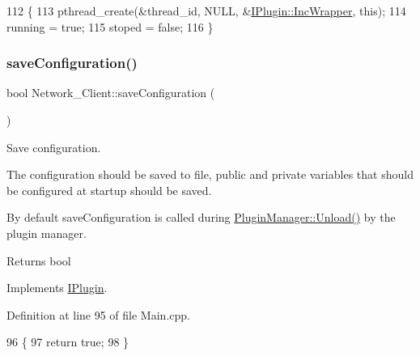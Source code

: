 \begin{DoxyCode}
112 \{
113     pthread\_create(&thread\_id, NULL, &\hyperlink{class_i_plugin_a62d22be2fdf66eb7f5c2f797f5f3d7f3}{IPlugin::IncWrapper}, \textcolor{keyword}{this});
114     running = \textcolor{keyword}{true};
115     stoped = \textcolor{keyword}{false};
116 \}
\end{DoxyCode}
\mbox{\label{class_network___client_aeaa8dcaafdecc5a9f417dc07060d6261}} 
\subsubsection{\texorpdfstring{save\+Configuration()}{saveConfiguration()}}
{\footnotesize\ttfamily bool Network\+\_\+\+Client\+::save\+Configuration (\begin{DoxyParamCaption}{ }\end{DoxyParamCaption})\hspace{0.3cm}{\ttfamily [virtual]}}



Save configuration. 

The configuration should be saved to file, public and private variables that should be configured at startup should be saved.

By default save\+Configuration is called during \hyperlink{class_plugin_manager_ab651a05d6fcb92562807e9f5ecc30855}{Plugin\+Manager\+::\+Unload()} by the plugin manager.

\begin{DoxyReturn}{Returns}
bool 
\end{DoxyReturn}


Implements \hyperlink{class_i_plugin_a79b5c42b1c7b08257a6110b2091039bc}{I\+Plugin}.



Definition at line 95 of file Main.\+cpp.


\begin{DoxyCode}
96 \{
97     \textcolor{keywordflow}{return} \textcolor{keyword}{true};
98 \}
\end{DoxyCode}
\mbox{\label{class_network___client_ad54dbc2ec20d9fbabcb5265401d072c2}} 

